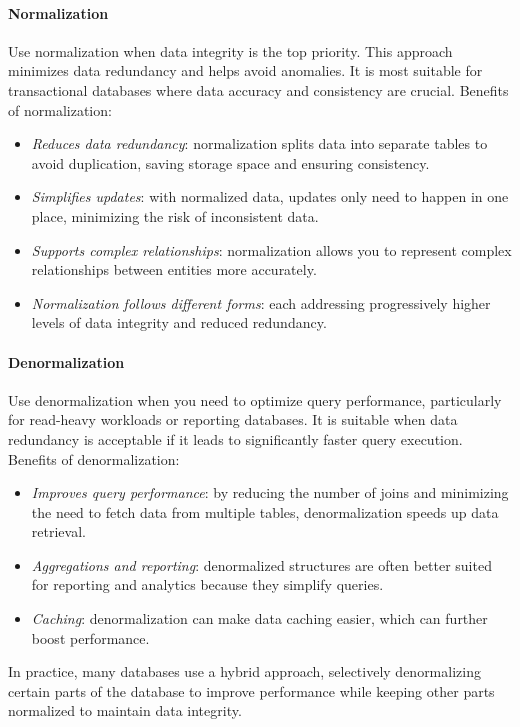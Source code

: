 \paragraph*{Normalization}
Use normalization when data integrity is the top priority. 
This approach minimizes data redundancy and helps avoid anomalies. 
It is most suitable for transactional databases where data accuracy and consistency are crucial.
Benefits of normalization:
\begin{itemize}
    \item \textit{Reduces data redundancy}: normalization splits data into separate tables to avoid duplication, saving storage space and ensuring consistency.
    \item \textit{Simplifies updates}: with normalized data, updates only need to happen in one place, minimizing the risk of inconsistent data.
    \item \textit{Supports complex relationships}: normalization allows you to represent complex relationships between entities more accurately.
    \item \textit{Normalization follows different forms}: each addressing progressively higher levels of data integrity and reduced redundancy.
\end{itemize}

\paragraph*{Denormalization}
Use denormalization when you need to optimize query performance, particularly for read-heavy workloads or reporting databases. 
It is suitable when data redundancy is acceptable if it leads to significantly faster query execution.
Benefits of denormalization:
\begin{itemize}
    \item \textit{Improves query performance}: by reducing the number of joins and minimizing the need to fetch data from multiple tables, denormalization speeds up data retrieval.
    \item \textit{Aggregations and reporting}: denormalized structures are often better suited for reporting and analytics because they simplify queries.
    \item \textit{Caching}: denormalization can make data caching easier, which can further boost performance.
\end{itemize}

In practice, many databases use a hybrid approach, selectively denormalizing certain parts of the database to improve performance while keeping other parts normalized to maintain data integrity.

